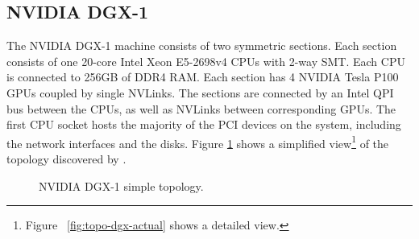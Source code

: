 \subsection{NVIDIA DGX-1}
\label{sec:topology-dgx1}

The NVIDIA DGX-1 machine consists of two symmetric sections.
Each section consists of one 20-core Intel Xeon E5-2698v4 CPUs with 2-way SMT.
Each CPU is connected to 256GB of DDR4 RAM.
Each section has 4 NVIDIA Tesla P100 GPUs coupled by single NVLinks.
The sections are connected by an Intel QPI bus between the CPUs, as well as NVLinks between corresponding GPUs.
The first CPU socket hosts the majority of the PCI devices on the system, including the network interfaces and the disks.
Figure \ref{fig:topo-dgx-simple} shows a simplified view\footnote{Figure ~\ref{fig:topo-dgx-actual} shows a detailed view.} of the topology discovered by .


\begin{figure}
    \centering
    \caption{NVIDIA DGX-1 simple topology.}
    \label{fig:topo-dgx-simple}
\end{figure}